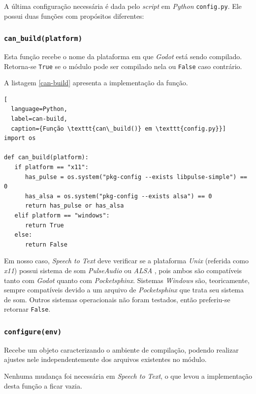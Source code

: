 A última configuração necessária é dada pelo \textit{script} em \textit{Python} \texttt{config.py}. Ele possui duas funções com propósitos diferentes:

\subsubsection{\texttt{can\_build(platform)}}

Esta função recebe o nome da plataforma em que \textit{Godot} está sendo compilado. Retorna-se \texttt{True} se o módulo pode ser compilado nela ou \texttt{False} caso contrário.

A listagem \ref{can-build} apresenta a implementação da função.

\begin{lstlisting}[
  language=Python,
  label=can-build,
  caption={Função \texttt{can\_build()} em \texttt{config.py}}]
import os

def can_build(platform):
   if platform == "x11":
      has_pulse = os.system("pkg-config --exists libpulse-simple") == 0
      has_alsa = os.system("pkg-config --exists alsa") == 0
      return has_pulse or has_alsa
   elif platform == "windows":
      return True
   else:
      return False
\end{lstlisting}

Em nosso caso, \textit{Speech to Text} deve verificar se a plataforma \textit{Unix} (referida como \textit{x11}) possui sistema de som \textit{PulseAudio} \citep{pulseaudio} ou \textit{ALSA} \citep{alsa}, pois ambos são compatíveis tanto com \textit{Godot} quanto com \textit{Pocketsphinx}. Sistemas \textit{Windows} são, teoricamente, sempre compatíveis devido a um arquivo de \textit{Pocketsphinx} que trata seu sistema de som. Outros sistemas operacionais não foram testados, então preferiu-se retornar \texttt{False}.

\subsubsection{\texttt{configure(env)}}

Recebe um objeto caracterizando o ambiente de compilação, podendo realizar ajustes nele independentemente dos arquivos existentes no módulo.

Nenhuma mudança foi necessária em \textit{Speech to Text}, o que levou a implementação desta função a ficar vazia.


